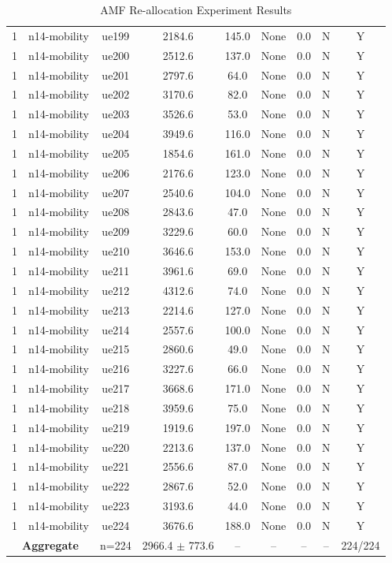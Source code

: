 \begin{table}[ht]
\begin{tabular}{|c|c|c|c|c|c|c|c|c|}
1 & n14-mobility & ue199 & 2184.6 & 145.0 & None & 0.0 & N & Y \\
1 & n14-mobility & ue200 & 2512.6 & 137.0 & None & 0.0 & N & Y \\
1 & n14-mobility & ue201 & 2797.6 & 64.0 & None & 0.0 & N & Y \\
1 & n14-mobility & ue202 & 3170.6 & 82.0 & None & 0.0 & N & Y \\
1 & n14-mobility & ue203 & 3526.6 & 53.0 & None & 0.0 & N & Y \\
1 & n14-mobility & ue204 & 3949.6 & 116.0 & None & 0.0 & N & Y \\
1 & n14-mobility & ue205 & 1854.6 & 161.0 & None & 0.0 & N & Y \\
1 & n14-mobility & ue206 & 2176.6 & 123.0 & None & 0.0 & N & Y \\
1 & n14-mobility & ue207 & 2540.6 & 104.0 & None & 0.0 & N & Y \\
1 & n14-mobility & ue208 & 2843.6 & 47.0 & None & 0.0 & N & Y \\
1 & n14-mobility & ue209 & 3229.6 & 60.0 & None & 0.0 & N & Y \\
1 & n14-mobility & ue210 & 3646.6 & 153.0 & None & 0.0 & N & Y \\
1 & n14-mobility & ue211 & 3961.6 & 69.0 & None & 0.0 & N & Y \\
1 & n14-mobility & ue212 & 4312.6 & 74.0 & None & 0.0 & N & Y \\
1 & n14-mobility & ue213 & 2214.6 & 127.0 & None & 0.0 & N & Y \\
1 & n14-mobility & ue214 & 2557.6 & 100.0 & None & 0.0 & N & Y \\
1 & n14-mobility & ue215 & 2860.6 & 49.0 & None & 0.0 & N & Y \\
1 & n14-mobility & ue216 & 3227.6 & 66.0 & None & 0.0 & N & Y \\
1 & n14-mobility & ue217 & 3668.6 & 171.0 & None & 0.0 & N & Y \\
1 & n14-mobility & ue218 & 3959.6 & 75.0 & None & 0.0 & N & Y \\
1 & n14-mobility & ue219 & 1919.6 & 197.0 & None & 0.0 & N & Y \\
1 & n14-mobility & ue220 & 2213.6 & 137.0 & None & 0.0 & N & Y \\
1 & n14-mobility & ue221 & 2556.6 & 87.0 & None & 0.0 & N & Y \\
1 & n14-mobility & ue222 & 2867.6 & 52.0 & None & 0.0 & N & Y \\
1 & n14-mobility & ue223 & 3193.6 & 44.0 & None & 0.0 & N & Y \\
1 & n14-mobility & ue224 & 3676.6 & 188.0 & None & 0.0 & N & Y \\
\multicolumn{2}{|c|}{\textbf{Aggregate}} & n=224 & 2966.4 $\pm$ 773.6 & -- & -- & -- & -- & 224/224 \\
\hline
\end{tabular}
\caption{AMF Re-allocation Experiment Results}
\label{tab:amf_realloc}
\end{table}
